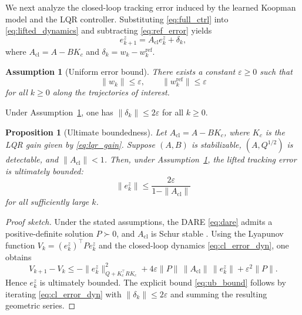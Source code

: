 \documentclass[journal]{IEEEtran}
\newtheorem{assumption}{Assumption}
\newtheorem{proposition}{Proposition}
\begin{document}
We next analyze the closed-loop tracking error induced by the learned Koopman model and the LQR controller. Substituting \eqref{eq:full_ctrl} into \eqref{eq:lifted_dynamics} and subtracting \eqref{eq:ref_error} yields
\begin{equation}
    e_{k+1}^z = A_{\mathrm{cl}} e_k^z + \delta_k,
    \label{eq:cl_error_dyn}
\end{equation}
where $A_{\mathrm{cl}} = A - BK_c$ and $\delta_k = w_k - w_k^{\mathrm{ref}}$.

\begin{assumption}[Uniform error bound]
\label{assump:bound}
There exists a constant $\varepsilon \geq 0$ such that
\begin{equation}
    \|w_k\| \leq \varepsilon,
    \qquad
    \|w_k^{\mathrm{ref}}\| \leq \varepsilon
    \label{eq:error_bound}
\end{equation}
for all $k \geq 0$ along the trajectories of interest.
\end{assumption}

Under Assumption~\ref{assump:bound}, one has $\|\delta_k\| \leq 2\varepsilon$ for all $k \geq 0$.

\begin{proposition}[Ultimate boundedness]
\label{prop:ub}
Let $A_{\mathrm{cl}} = A - BK_c$, where $K_c$ is the LQR gain given by \eqref{eq:lqr_gain}. Suppose $(A,B)$ is stabilizable, $(A,Q^{1/2})$ is detectable, and $\|A_{\mathrm{cl}}\| < 1$. Then, under Assumption~\ref{assump:bound}, the lifted tracking error is ultimately bounded:
\begin{equation}
    \|e_k^z\| \leq \frac{2\varepsilon}{1 - \|A_{\mathrm{cl}}\|}
    \label{eq:ub_bound}
\end{equation}
for all sufficiently large $k$.
\end{proposition}

\begin{proof}[Proof sketch]
Under the stated assumptions, the DARE \eqref{eq:dare} admits a positive-definite solution $P \succ 0$, and $A_{\mathrm{cl}}$ is Schur stable \cite{korda2018linear}. Using the Lyapunov function $V_k = (e_k^z)^\top P e_k^z$ and the closed-loop dynamics \eqref{eq:cl_error_dyn}, one obtains
\begin{equation}
    V_{k+1} - V_k
    \leq
    -\|e_k^z\|_{Q+K_c^\top R K_c}^2
    + 4\varepsilon \|P\|\,\|A_{\mathrm{cl}}\|\,\|e_k^z\|
    + \varepsilon^2 \|P\|.
\end{equation}
Hence $e_k^z$ is ultimately bounded. The explicit bound \eqref{eq:ub_bound} follows by iterating \eqref{eq:cl_error_dyn} with $\|\delta_k\| \leq 2\varepsilon$ and summing the resulting geometric series.
\end{proof}
\end{document}
